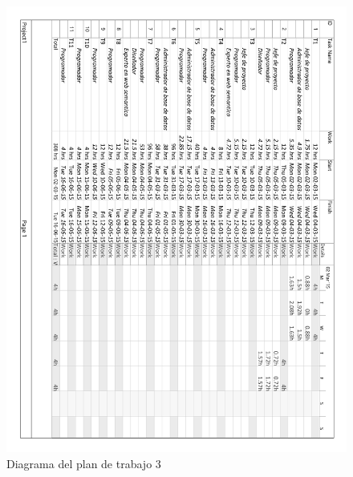 \begin{figure}[!htp]
	\centering
	\includegraphics[page=3, scale=.8]{fig/real_work_plan_diagram}
	\caption{Diagrama del plan de trabajo 3}
\end{figure}

